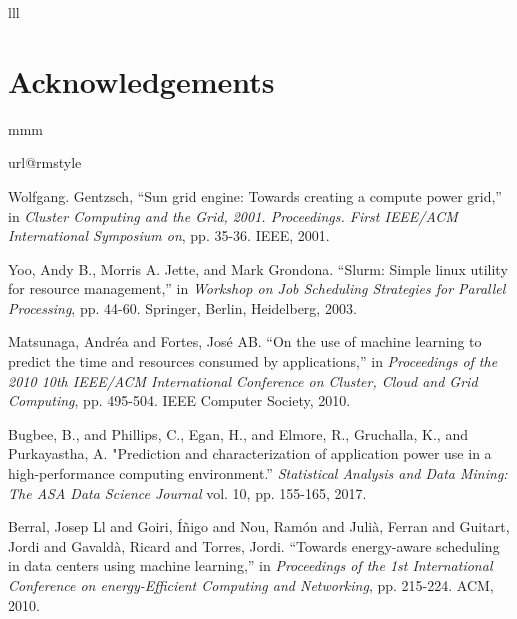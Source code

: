 \documentclass[conference]{csce}
\begin{document}
lll

\section{Acknowledgements}

mmm

\begin{thebibliography}{1}
	\providecommand{\url}[1]{#1}
	\csname url@rmstyle\endcsname
	\providecommand{\newblock}{\relax}
	\providecommand{\bibinfo}[2]{#2}
	\providecommand\BIBentrySTDinterwordspacing{\spaceskip=0pt\relax}
	\providecommand\BIBentryALTinterwordstretchfactor{4}
	\providecommand\BIBentryALTinterwordspacing{\spaceskip=\fontdimen2\font plus
		\BIBentryALTinterwordstretchfactor\fontdimen3\font minus
		\fontdimen4\font\relax}
	\providecommand\BIBforeignlanguage[2]{{%
			\expandafter\ifx\csname l@#1\endcsname\relax
			\typeout{** WARNING: IEEEtran.bst: No hyphenation pattern has been}%
			\typeout{** loaded for the language `#1'. Using the pattern for}%
			\typeout{** the default language instead.}%
			\else
			\language=\csname l@#1\endcsname
			\fi
			#2}}
	
	 Wolfgang. Gentzsch, ``Sun grid engine: Towards creating a compute power grid,'' 
 	in \emph{Cluster Computing and the Grid, 2001. Proceedings. First IEEE/ACM International Symposium on}, pp. 35-36. IEEE, 2001.
	
	Yoo, Andy B., Morris A. Jette, and Mark Grondona. ``Slurm: Simple linux utility for resource management,'' in \emph{Workshop on Job Scheduling Strategies for Parallel Processing}, pp. 44-60. Springer, Berlin, Heidelberg, 2003.
	
	Matsunaga, Andr{\'e}a and Fortes, Jos{\'e} AB. ``On the use of machine learning to predict the time and resources consumed by applications,'' in \emph{Proceedings of the 2010 10th IEEE/ACM International Conference on Cluster, Cloud and Grid Computing}, pp. 495-504. IEEE Computer Society, 2010.
	
	Bugbee, B., and Phillips, C., Egan, H., and Elmore, R., Gruchalla, K., and Purkayastha, A. "Prediction and characterization of application power use in a high-performance computing environment.'' \emph{Statistical Analysis and Data Mining: The ASA Data Science Journal} vol. 10, pp. 155-165, 2017.
	
	Berral, Josep Ll and Goiri, {\'I}{\~n}igo and Nou, Ram{\'o}n and Juli{\`a}, Ferran and Guitart, Jordi and Gavald{\`a}, Ricard and Torres, Jordi. ``Towards energy-aware scheduling in data centers using machine learning,'' in \emph{Proceedings of the 1st International Conference on energy-Efficient Computing and Networking}, pp. 215-224. ACM, 2010.
	

\end{thebibliography}
\end{document}
